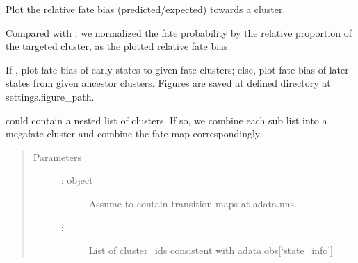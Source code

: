 \documentclass[letterpaper,10pt,english]{sphinxmanual}
\begin{document}
\begin{fulllineitems}
\label{\detokenize{cospar.pl.fate_bias_intrinsic:cospar.pl.fate_bias_intrinsic}}
Plot the relative fate bias (predicted/expected) towards a cluster.

Compared with {\hyperref[\detokenize{cospar.pl.fate_map:cospar.pl.fate_map}]{}}, we normalized the fate probability by the
relative proportion of the targeted cluster, as the plotted relative fate bias.

If , plot fate bias of early
states to given fate clusters; else, plot fate bias of later states
from given ancestor clusters. Figures are saved at defined
directory at settings.figure\_path.

 could contain a nested list of clusters. If so, we
combine each sub list into a mega\sphinxhyphen{}fate cluster and combine the fate
map correspondingly.
\begin{quote}\begin{description}
\item[{Parameters}] \leavevmode\begin{description}
\item[{ :  object}] \leavevmode
Assume to contain transition maps at adata.uns.

\item[{ : }] \leavevmode
List of cluster\_ids consistent with adata.obs{[}‘state\_info’{]}


\end{description}
\end{description}
\end{quote}
\end{fulllineitems}
\end{document}
